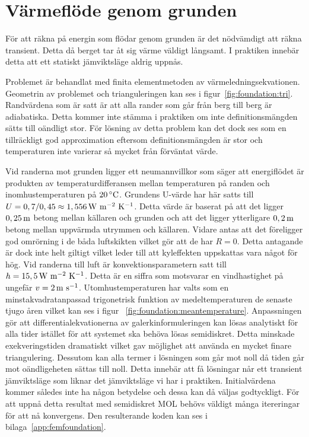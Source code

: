 \section{Värmeflöde genom grunden}

För att räkna på energin som flödar genom grunden är det nödvämdigt att räkna
transient. Detta då berget tar åt sig värme väldigt långsamt. I praktiken innebär detta att ett statiskt jämviktsläge aldrig uppnås.

Problemet är behandlat med finita elementmetoden av värmeledningsekvationen.
Geometrin av problemet och trianguleringen kan ses i figur~\ref{fig:foundation:tri}.
Randvärdena som är satt är att alla rander som går från berg till berg är adiabatiska.
Detta kommer inte stämma i praktiken om inte definitionsmängden sätts till oändligt
stor. För lösning av detta problem kan det dock ses som en tillräckligt god
approximation eftersom definitionsmängden är stor och temperaturen inte varierar så mycket
från förväntat värde.

Vid randerna mot grunden ligger ett neumannvillkor som säger att energiflödet är produkten
av temperaturdifferansen mellan temperaturen på randen och inomhustemperaturen på $\unit[20]{^\circ C}$.
Grundens U-värde har här satts till $U = 0,7/0,45 \approx \unit[1,556]{W~m^{-2}~K^{-1}}$. Detta värde är
baserat på att det ligger $\unit[0,25]{m}$ betong mellan källaren och grunden och att det ligger ytterligare $\unit[0,2]{m}$
betong mellan uppvärmda utrymmen och källaren. Vidare antas att det föreligger god omrörning i de båda
luftskikten vilket gör att de har $R=0$. Detta antagande är dock inte helt giltigt vilket leder till att kyleffekten
uppskattas vara något för hög.
Vid randerna till luft är konvektionsparametern satt
till $h = \unit[15,5]{W~m^{-2}~K^{-1}}$. Detta är en siffra som motsvarar
en vindhastighet på ungefär $v = \unit[2]{m~s^{-1}}$. Utomhustemperaturen har valts
som en minstakvadratanpassad trigonetrisk funktion av
medeltemperaturen de senaste tjugo åren vilket kan ses i figur~
\ref{fig:foundation:meantemperature}. Anpassningen gör att
differentialekvationerna av galerkinformuleringen kan lösas analytiskt
för alla tider istället för att systemet ska behöva lösas semidiskret.
Detta minskade exekveringstiden dramatiskt vilket gav möjlighet att använda en
mycket finare triangulering. Dessutom kan alla termer i lösningen
som går mot noll då tiden går mot oändligeheten sättas till noll. Detta innebär
att få lösningar når ett transient jämviktsläge som liknar det jämviktsläge vi har i praktiken.
Initialvärdena kommer således inte ha någon betydelse och dessa kan då väljas
godtyckligt. 
För att uppnå detta resultat med semidiskret MOL behövs väldigt många itereringar för att
nå konvergens. Den resulterande koden kan ses i bilaga~\ref{app:femfoundation}.

